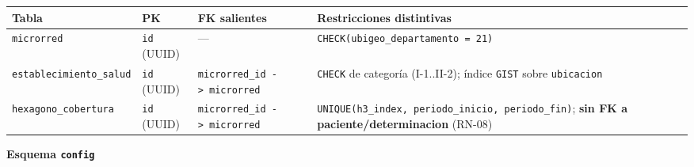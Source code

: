 \documentclass[11pt,a4paper]{article}
\begin{document}
{\small
\begin{longtable}[]{@{}
  >{\raggedright\arraybackslash}p{}
  >{\raggedright\arraybackslash}p{}
  >{\raggedright\arraybackslash}p{}
  >{\raggedright\arraybackslash}p{}@{}}
\toprule\noalign{}
\begin{minipage}[b]{\linewidth}\raggedright
Tabla
\end{minipage} & \begin{minipage}[b]{\linewidth}\raggedright
PK
\end{minipage} & \begin{minipage}[b]{\linewidth}\raggedright
FK salientes
\end{minipage} & \begin{minipage}[b]{\linewidth}\raggedright
Restricciones distintivas
\end{minipage} \\
\midrule\noalign{}
\endhead
\bottomrule\noalign{}
\endlastfoot
\texttt{microrred} & \texttt{id} (UUID) & --- & \texttt{CHECK(ubigeo\_departamento\ =\ \textquotesingle{}21\textquotesingle{})} \\
\texttt{establecimiento\_salud} & \texttt{id} (UUID) & \texttt{microrred\_id\ -\textgreater{}\ microrred} & \texttt{CHECK} de categoría (I-1..II-2); índice \texttt{GIST} sobre \texttt{ubicacion} \\
\texttt{hexagono\_cobertura} & \texttt{id} (UUID) & \texttt{microrred\_id\ -\textgreater{}\ microrred} & \texttt{UNIQUE(h3\_index,\ periodo\_inicio,\ periodo\_fin)}; \textbf{sin FK a paciente/determinacion} (RN-08) \\
\end{longtable}
}

\textbf{Esquema \texttt{config}}
\end{document}
